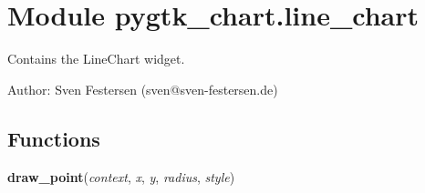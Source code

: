 %
%
%


\section{Module pygtk\_chart.line\_chart}

    \label{pygtk_chart:line_chart}
Contains the LineChart widget.

Author: Sven Festersen (sven@sven-festersen.de)



  \subsection{Functions}

    \label{pygtk_chart:line_chart:draw_point}

    \vspace{0.5ex}

\hspace{.8\funcindent}\begin{boxedminipage}{\funcwidth}

    \raggedright \textbf{draw\_point}(\textit{context}, \textit{x}, \textit{y}, \textit{radius}, \textit{style})

\setlength{\parskip}{2ex}
\setlength{\parskip}{1ex}
    \end{boxedminipage}

    \label{pygtk_chart:line_chart:draw_point_pixbuf}

    \vspace{0.5ex}

